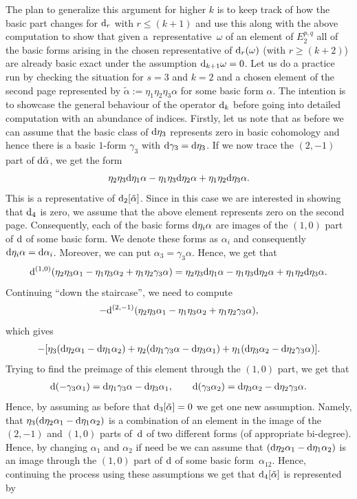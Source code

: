 \documentclass[pdftex]{sigma}
\numberwithin{equation}{section}
\theoremstyle{definition}
\begin{document}
The plan to generalize this argument for higher $k$ is to keep track of how the basic part changes for ${\rm d}_r$ with $r\leq (k+1)$ and use this along with the above computation to show that given a~representative~$\omega$ of an element of $E_2^{p,q}$ all of the basic forms arising in the chosen representative of ${\rm d}_r(\omega)$ (with $r\geq (k+2)$) are already basic exact under the assumption ${\rm d}_{k+1}\omega=0$. Let us do a practice run by checking the situation for $s=3$ and $k=2$ and a chosen element of the second page represented by $\tilde{\alpha}:=\eta_1\eta_2\eta_3\alpha$ for some basic form $\alpha$. The intention is to showcase the general behaviour of the operator ${\rm d}_k$ before going into detailed computation with an abundance of indices. Firstly, let us note that as before we can assume that the basic class of ${\rm d}\eta_3$ represents zero in basic cohomology and hence there is a basic $1$-form $\gamma_3$ with ${\rm d}\gamma_3={\rm d}\eta_3$. If we now trace the $(2,-1)$ part of ${\rm d}\tilde{\alpha}$, we get the form
\[\eta_2\eta_3{\rm d}\eta_1\alpha-\eta_1\eta_3{\rm d}\eta_2\alpha+\eta_1\eta_2{\rm d}\eta_3\alpha.\]
This is a representative of ${\rm d}_2[\tilde{\alpha}]$. Since in this case we are interested in showing that ${\rm d}_4$ is zero, we assume that the above element represents zero on the second page. Consequently, each of the basic forms ${\rm d}\eta_i\alpha$ are images of the $(1,0)$ part of ${\rm d}$ of some basic form. We denote these forms as $\alpha_i$ and consequently
${\rm d}\eta_i\alpha={\rm d}\alpha_i$.
Moreover, we can put
$\alpha_3=\gamma_3\alpha$.
Hence, we get that
\[{\rm d}^{(1,0)}(\eta_2\eta_3\alpha_1-\eta_1\eta_3\alpha_2+\eta_1\eta_2\gamma_3\alpha)= \eta_2\eta_3{\rm d}\eta_1\alpha-\eta_1\eta_3{\rm d}\eta_2\alpha+\eta_1\eta_2{\rm d}\eta_3\alpha.\]
Continuing ``down the staircase'', we need to compute
\[-{\rm d}^{(2,-1)}(\eta_2\eta_3\alpha_1-\eta_1\eta_3\alpha_2+\eta_1\eta_2\gamma_3\alpha),\]
which gives
\[-[\eta_3({\rm d}\eta_2\alpha_1-{\rm d}\eta_1\alpha_2)+\eta_2({\rm d}\eta_1\gamma_3\alpha-{\rm d}\eta_3\alpha_1)+\eta_1({\rm d}\eta_3\alpha_2-{\rm d}\eta_2\gamma_3\alpha)].\]
Trying to find the preimage of this element through the $(1,0)$ part, we get that
\begin{gather*}
{\rm d}(-\gamma_3\alpha_1)={\rm d}\eta_1\gamma_3\alpha-{\rm d}\eta_3\alpha_1,\qquad
{\rm d}(\gamma_3\alpha_2)={\rm d}\eta_3\alpha_2-{\rm d}\eta_2\gamma_3\alpha.
\end{gather*}
Hence, by assuming as before that ${\rm d}_3[\tilde{\alpha}]=0$ we get one new assumption. Namely, that $\eta_3({\rm d}\eta_2\alpha_1-{\rm d}\eta_1\alpha_2)$ is a combination of an element in the image of the $(2,-1)$ and $(1,0)$ parts of~${\rm d}$ of two different forms (of appropriate bi-degree). Hence, by changing $\alpha_1$ and $\alpha_2$ if need be we can assume that $({\rm d}\eta_2\alpha_1-{\rm d}\eta_1\alpha_2)$ is an image through the $(1,0)$ part of ${\rm d}$ of some basic form~$\alpha_{12}$. Hence, continuing the process using these assumptions we get that ${\rm d}_4[\tilde{\alpha}]$ is represented by
\end{document}
